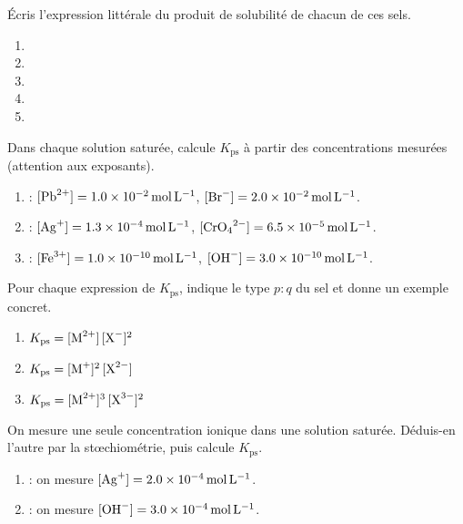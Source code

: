 \documentclass[11pt,a4paper]{article}
\begin{document}
\begin{exo}
Écris l'expression littérale du produit de solubilité de chacun de ces sels.
\begin{enumerate}[label=\alph*)]
  \item {}
  \item {}
  \item {}
  \item {}
  \item {}
\end{enumerate}
\end{exo}

\begin{exo}
Dans chaque solution saturée, calcule $K_{\mathrm{ps}}$ à partir des concentrations mesurées (attention
aux exposants).
\begin{enumerate}[label=\alph*)]
  \item {} : $[\ce{Pb^{2+}}]=\qty{1.0e-2}{\mole\per\litre}$, $[\ce{Br-}]=\qty{2.0e-2}{\mole\per\litre}$.
  \item {} : $[\ce{Ag+}]=\qty{1.3e-4}{\mole\per\litre}$, $[\ce{CrO4^{2-}}]=\qty{6.5e-5}{\mole\per\litre}$.
  \item {} : $[\ce{Fe^{3+}}]=\qty{1.0e-10}{\mole\per\litre}$, $[\ce{OH-}]=\qty{3.0e-10}{\mole\per\litre}$.
\end{enumerate}
\end{exo}

\begin{exo}
Pour chaque expression de $K_{\mathrm{ps}}$, indique le type $p{:}q$ du sel et donne un exemple concret.
\begin{enumerate}[label=\alph*)]
  \item $K_{\mathrm{ps}} = [\ce{M^{2+}}]\,[\ce{X-}]^{2}$
  \item $K_{\mathrm{ps}} = [\ce{M+}]^{2}\,[\ce{X^{2-}}]$
  \item $K_{\mathrm{ps}} = [\ce{M^{2+}}]^{3}\,[\ce{X^{3-}}]^{2}$
\end{enumerate}
\end{exo}

\begin{exo}
On mesure une seule concentration ionique dans une solution saturée. Déduis-en l'autre par la
stœchiométrie, puis calcule $K_{\mathrm{ps}}$.
\begin{enumerate}[label=\alph*)]
  \item {} : on mesure $[\ce{Ag+}]=\qty{2.0e-4}{\mole\per\litre}$.
  \item {} : on mesure $[\ce{OH-}]=\qty{3.0e-4}{\mole\per\litre}$.
\end{enumerate}
\end{exo}
\end{document}
